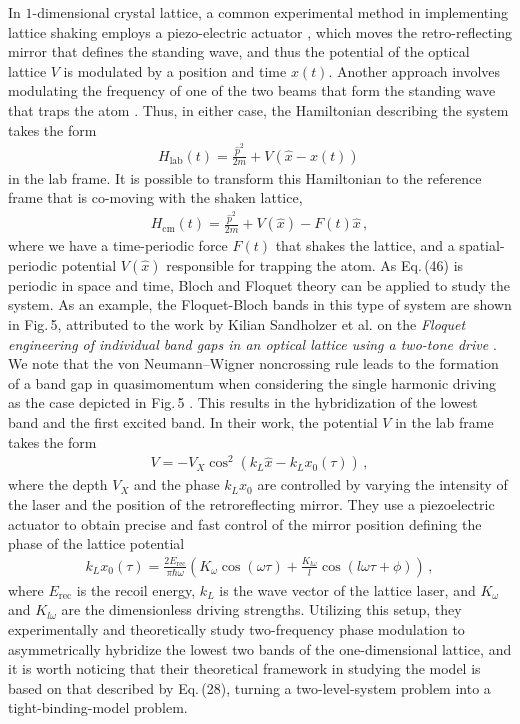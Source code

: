 \documentclass[reprint, amsmath, amssymb, aps]{revtex4-2}
\begin{document}
In $1$-dimensional crystal lattice, a common experimental method in implementing lattice shaking employs a piezo-electric actuator \cite{Viebahn, Sandholzer}, which moves the retro-reflecting mirror that defines the standing wave, and thus the potential of the optical lattice $V$ is modulated by a position and time $x(t)$. Another approach involves modulating the frequency of one of the two beams that form the standing wave that traps the atom \cite{Viebahn}. Thus, in either case, the Hamiltonian describing the system takes the form
\begin{align}
H_{\text{lab}}(t) = \frac{\hat{p}^2}{2m} + V(\hat{x} - x(t))\,
\end{align}
in the lab frame. It is possible to transform this Hamiltonian to the reference frame that is co-moving with the shaken lattice,
\begin{align}
H_{\text{cm}}(t) = \frac{\hat{p}^2}{2m} + V(\hat{x}) - F(t)\hat{x}\,,
\end{align}
where we have a time-periodic force $F(t)$ that shakes the lattice, and a spatial-periodic potential $V(\hat{x})$ responsible for trapping the atom. As Eq.\,(46) is periodic in space and time, Bloch and Floquet theory can be applied to study the system. As an example, the Floquet-Bloch bands in this type of system are shown in Fig.\,5, attributed to the work by Kilian Sandholzer et al. on the \textit{Floquet engineering of individual band gaps in an optical lattice using a two-tone drive} \cite{Sandholzer}. We note that the von Neumann–Wigner noncrossing rule leads to the formation of a band gap in quasimomentum when considering the single harmonic driving as the case depicted in Fig.\,5 \cite{57}. This results in the hybridization of the lowest band and the first excited band. In their work, the potential $V$ in the lab frame takes the form
\begin{align}
V = -V_X \cos^2\left( k_L \hat{x} - k_L x_0(\tau)\right)\,,
\end{align}
where the depth $V_X$ and the phase $k_Lx_0$ are controlled by varying the intensity of the laser and the position of the retroreflecting mirror. They use a piezoelectric actuator to obtain precise and fast control of the mirror position defining the phase of the lattice potential 
\begin{align}
k_Lx_0(\tau) = \frac{2E_{\text{rec}}}{\pi \hbar \omega}\left( K_\omega \cos(\omega \tau) + \frac{K_{l\omega}}{l}\cos(l\omega \tau +\phi)\right)\,,
\end{align}
where $E_{\text{rec}}$ is the recoil energy, $k_L$ is the wave vector of the lattice laser, and $K_\omega$ and $K_{l\omega}$ are the dimensionless driving strengths. Utilizing this setup, they experimentally and theoretically study two-frequency phase modulation to asymmetrically hybridize the lowest two bands of the one-dimensional lattice, and it is worth noticing that their theoretical framework in studying the model is based on that described by Eq.\,(28), turning a two-level-system problem into a tight-binding-model problem. 
\end{document}
